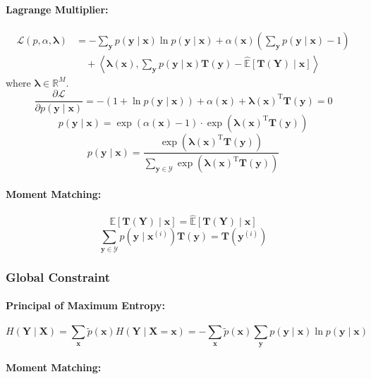 \documentclass{article}
\begin{document}
\paragraph{Lagrange Multiplier:}
\begin{align*}
    \mathcal{L}(p, \alpha, \boldsymbol{\lambda}) &= - \sum_{\mathbf{y}} p(\mathbf{y} \mid \mathbf{x}) \ln p(\mathbf{y} \mid \mathbf{x}) + \alpha(\mathbf{x}) \left(\sum_{\mathbf{y}} p(\mathbf{y} \mid \mathbf{x}) - 1\right) \\
    &\quad + \left\langle \boldsymbol{\lambda}(\mathbf{x}), \sum_{\mathbf{y}} p(\mathbf{y} \mid \mathbf{x}) \mathbf{T}(\mathbf{y}) - \hat{\mathbb{E}}[\mathbf{T}(\mathbf{Y}) \mid \mathbf{x}] \right\rangle
\end{align*}
where $\boldsymbol{\lambda} \in \mathbb{R}^M$.
\[
    \frac{\partial \mathcal{L}}{\partial p(\mathbf{y} \mid \mathbf{x})} = - (1 + \ln p(\mathbf{y} \mid \mathbf{x})) + \alpha(\mathbf{x}) + \boldsymbol{\lambda}(\mathbf{x})^{\mathrm{T}} \mathbf{T}(\mathbf{y}) = 0
\]
\[
    p(\mathbf{y} \mid \mathbf{x}) = \exp(\alpha(\mathbf{x}) - 1) \cdot \exp(\boldsymbol{\lambda}(\mathbf{x})^{\mathrm{T}} \mathbf{T}(\mathbf{y}))
\]
\[
    p(\mathbf{y} \mid \mathbf{x}) = \frac{\exp(\boldsymbol{\lambda}(\mathbf{x})^{\mathrm{T}} \mathbf{T}(\mathbf{y}))}{\sum_{\mathbf{y} \in \mathcal{Y}} \exp(\boldsymbol{\lambda}(\mathbf{x})^{\mathrm{T}} \mathbf{T}(\mathbf{y}))}
\]
\paragraph{Moment Matching:}
\[
    \mathbb{E}[\mathbf{T}(\mathbf{Y}) \mid \mathbf{x}] = \hat{\mathbb{E}}[\mathbf{T}(\mathbf{Y}) \mid \mathbf{x}]
\]
\[
    \sum_{\mathbf{y} \in \mathcal{Y}} p(\mathbf{y} \mid \mathbf{x}^{(i)}) \mathbf{T}(\mathbf{y}) = \mathbf{T}(\mathbf{y}^{(i)})
\]

\subsubsection{Global Constraint}

\paragraph{Principal of Maximum Entropy:}
\[
    H(\mathbf{Y} \mid \mathbf{X}) = \sum_\mathbf{x} \tilde{p}(\mathbf{x}) H(\mathbf{Y} \mid \mathbf{X}=\mathbf{x}) = - \sum_\mathbf{x} \tilde{p}(\mathbf{x}) \sum_{\mathbf{y}} p(\mathbf{y} \mid \mathbf{x}) \ln p(\mathbf{y} \mid \mathbf{x})
\]
\paragraph{Moment Matching:}
\end{document}
